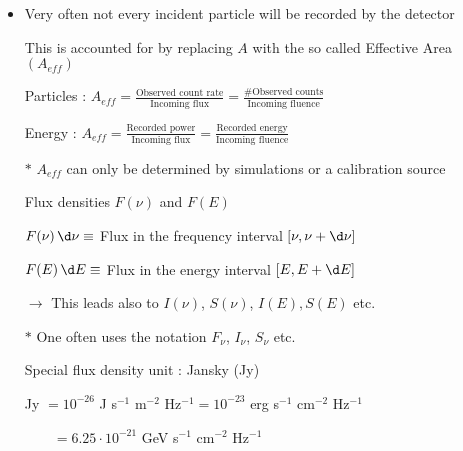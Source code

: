 \Tr
\onecolumn
\begin{itemize}
\item Very often not every incident particle will be recorded by the detector
\item[] This is accounted for by replacing $A$ with the so called {\blue Effective Area $(A_{eff})$}
\item[] {\blue Particles :
        $\displaystyle A_{eff}=\frac{\text{Observed count rate}}{\text{Incoming flux}} =
         \frac{\text{\# Observed counts}}{\text{Incoming fluence}}$}
\item[] {\blue Energy :
        $\displaystyle A_{eff}=\frac{\text{Recorded power}}{\text{Incoming flux}} =
         \frac{\text{Recorded energy}}{\text{Incoming fluence}}$}
\item[$\ast$] $A_{eff}$ can only be determined by simulations or a calibration source
\item[] \begin{center} {\red Flux densities $F(\nu)$ and $F(E)$} \end{center}
\item[] {\blue $F(\nu)\,\d\nu \equiv$ Flux in the frequency interval $[\nu,\nu+\d\nu]$}
\item[] {\blue $F(E)\,\d E \equiv$ Flux in the energy interval $[E,E+\d E]$}
\item[] $\rightarrow$ This leads also to $I(\nu)$, $S(\nu)$, $I(E), S(E)$ etc.
\item[$\ast$] One often uses the notation $F_{\nu}$, $I_{\nu}$, $S_{\nu}$ etc.
\item[] \begin{center}{\blue Special flux density unit : Jansky (Jy)}\end{center}
\item[] { Jy $=10^{-26}$ J s$^{-1}$ m$^{-2}$ Hz$^{-1}
         =10^{-23}$ erg s$^{-1}$ cm$^{-2}$ Hz$^{-1}$}
\item[] {\blue $\qquad =6.25 \cdot 10^{-21}$ GeV s$^{-1}$ cm$^{-2}$ Hz$^{-1}$}
\end{itemize}
